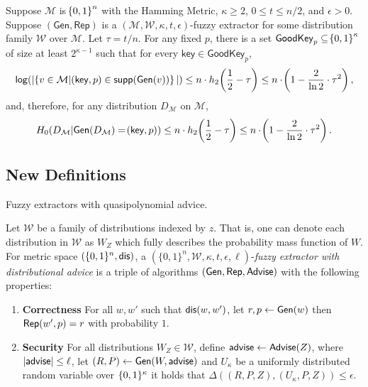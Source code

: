 \begin{lemma}
    \label{lem:smallgeneralviable}
    Suppose $\mathcal{M}$ is $\!\left\{ 0,1 \right\}^{n}$ with the Hamming Metric, $\kappa \geq 2$, $0 \leq t \leq n/2$, and $\epsilon > 0$. 
    Suppose $(\mathsf{Gen, Rep})$ is a $(\mathcal{M,W},\kappa, t, \epsilon)$-fuzzy extractor for some distribution family $\mathcal{W}$ over $\mathcal{M}$. 
    Let $\tau = t/n$. 
    For any fixed $p$, there is a set $\mathsf{GoodKey}_p \subseteq \!\left\{ 0,1 \right\}^{\kappa}$ of size at least $2^{\kappa - 1}$ such that for every $\mathsf{key} \in \mathsf{GoodKey}_p$,
    \[
        \mathsf{log}\!\left(|\!\left\{ v \in \mathcal{M}|\!\left(\mathsf{key}, p\right) \in \mathsf{supp}\!\left(\mathsf{Gen}(v)\right) \right\}|\right) \leq n \cdot h_2\!\left(\frac{1}{2} - \tau\right) \leq n \cdot \!\left(1 - \frac{2}{\ln{2}} \cdot \tau^{2}\right), 
    \]   
    and, therefore, for any distribution $D_{\mathcal{M}}$ on $\mathcal{M}$, 
    \[
        H_0\!\left(D_{\mathcal{M}}|\mathsf{Gen}\!\left(D_{\mathcal{M}}\right) = \!\left(\mathsf{key}, p\right)\right) \leq n \cdot h_2\!\left(\frac{1}{2} - \tau\right) \leq n \cdot \!\left(1 - \frac{2}{\ln{2}} \cdot \tau^{2}\right).
    \]   
\end{lemma}

\subsection{New Definitions}
Fuzzy extractors with quasipolynomial advice. 

\begin{definition}
Let $\mathcal{W}$ be a family of distributions indexed by $z$.  That is, one can denote each distribution in $\mathcal{W}$ as $W_Z$ which fully describes the probability mass function of $W$.  
For metric space $(\{0,1\}^n, \mathsf{dis})$, a $(\{0,1\}^n, \mathcal{W}, \kappa, t, \epsilon, \ell)$-\emph{fuzzy extractor with distributional advice} is a triple of algorithms $({\mathsf{Gen}}, {\mathsf{Rep}}, {\mathsf{Advise}})$ with the following properties:
\begin{enumerate} 
\itemsep0em
\item \textbf{Correctness} For all $w, w'$ such that $\mathsf{dis}(w, w')$, let $r, p \leftarrow {\ensuremath{\mathsf{Gen}}}(w)$ then ${\mathsf{Rep}}(w', p) = r$ with probability $1$. 
\item \textbf{Security} For all distributions $W_Z \in \mathcal{W}$, define ${\mathsf{advise}} \leftarrow {\ensuremath{\mathsf{Advise}}}(Z)$, where $|{\mathsf{advise}}| \le \ell$, let $(R, P) \leftarrow {\ensuremath{\mathsf{Gen}}}(W, {\mathsf{advise}})$ and $U_\kappa$ be a uniformly distributed random variable over $\{0, 1\}^\kappa$ it holds that $\Delta((R, P, Z), (U_\kappa, P, Z))\le \epsilon.$
\end{enumerate}
\end{definition}

